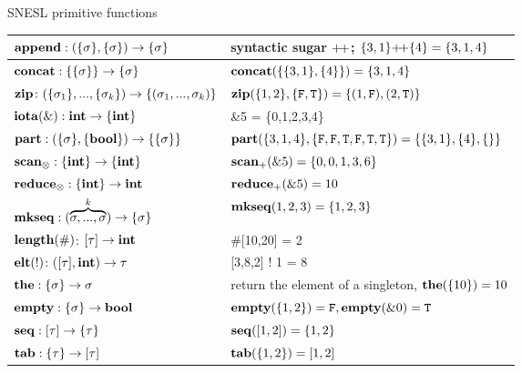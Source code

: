 \documentclass{beamer}
\begin{document}
\begin{frame}[fragile]{SNESL primitive functions}
	\begin{table}\footnotesize 
		\begin{tabular}{p{}|p{}}
			\hline
			$\mathbf{append : (\{\sigma\}, \{\sigma\}) \rightarrow \{\sigma\}}$ &  syntactic sugar ${\++}$; $\{3,1\} {\++} \{4\} = \{3,1,4\}$ \\ \hline
			$\mathbf{concat: \{\{\sigma\}\} \rightarrow \{\sigma\} }$ &  $\mathbf{concat}(\{\{3,1\},\{4\}\}) = \{3,1,4\}$                \\ \hline
			$\mathbf{zip} \colon (\{\sigma_1\}, ..., \{\sigma_k\})\rightarrow \{(\sigma_1,...,\sigma_k)\}$ & $\mathbf{zip}(\{1,2\},\{\mathtt{F},\mathtt{T}\}) = \{(1,\mathtt{F}),(2,\mathtt{T})\}$\\ \hline
			$\mathbf{iota(\&): \mathbf{int} \rightarrow \{\mathbf{int}\}}$  &  \&5 = \{0,1,2,3,4\} \\ \hline
			$\mathbf{part: (\{\sigma\}, \{\mathbf{bool}\}) \rightarrow  \{\{\sigma\}\}}$   & $\mathbf{part}(\{3,1,4\}, \{\mathtt{F},\mathtt{F},\mathtt{T},\mathtt{F},\mathtt{T},\mathtt{T}\}) = \{\{3,1\},\{4\},\{\}\}$                \\ \hline
			$\mathbf{scan_\otimes}: \{\mathbf{int}\} \rightarrow \{\mathbf{int}\}$     & $\mathbf{scan_+}(\&5) = \{0,0,1,3,6\} $  \\ \hline
			$\mathbf{reduce_\otimes: \{\mathbf{int}\} \rightarrow \mathbf{int} }$     &  $\mathbf{reduce_+}(\&5) = 10$              \\ \hline
			$\mathbf{mkseq}: (\overbrace{\sigma,...,\sigma}^{k}) \rightarrow \{\sigma\}$  & $\mathbf{mkseq}(1,2,3) = \{1,2,3\}$ \\ \hline  
			$\mathbf{length(\#)}$: $[\tau] \rightarrow \mathbf{int}$ & \#[10,20] = 2\\ \hline  
			$\mathbf{elt(!)}$: ($[\tau], \mathbf{int}) \rightarrow \tau$  & [3,8,2] ! 1 = 8 \\ \hline  
			$\mathbf{the:  \{\sigma\} \rightarrow \sigma}$     &  return the element of a singleton,  $\mathbf{the}(\{10\}) = 10$        \\ \hline
			$\mathbf{empty:  \{\sigma\} \rightarrow \mathbf{bool}}$       & $\mathbf{empty}(\{1,2\}) = \mathtt{F}, \mathbf{empty}(\&0)= \mathtt{T}$      \\ \hline  
			$\mathbf{seq}: [\tau] \rightarrow \{\tau\} $  & $\mathbf{seq}([1,2]) = \{1,2\}$ \\ \hline  
			$\mathbf{tab}: \{\tau\} \rightarrow [\tau] $  & $\mathbf{tab}(\{1,2\}) = [1,2]$\\ \hline  
		\end{tabular}
	\end{table}
	
\end{frame}

%
% 
% 
%	
\end{document}
